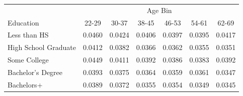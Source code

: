 \begin{tabular}{lcccccc}
\hline\hline
 & \multicolumn{6}{c}{Age Bin} \\
Education & 22-29 & 30-37 & 38-45 & 46-53 & 54-61 & 62-69 \\
\hline
Less than HS&0.0460&0.0424&0.0406&0.0397&0.0395&0.0417\\
High School Graduate&0.0412&0.0382&0.0366&0.0362&0.0355&0.0351\\
Some College&0.0449&0.0411&0.0392&0.0386&0.0383&0.0392\\
Bachelor's Degree&0.0393&0.0375&0.0364&0.0359&0.0361&0.0347\\
Bachelors+&0.0389&0.0372&0.0355&0.0354&0.0349&0.0345\\
\hline\hline
\end{tabular}
